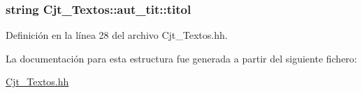 \subsubsection[{\texorpdfstring{titol}{titol}}]{\setlength{\rightskip}{0pt plus 5cm}string Cjt\+\_\+\+Textos\+::aut\+\_\+tit\+::titol}\hypertarget{struct_cjt___textos_1_1aut__tit_a4d7d3796333130213bcbe0ba9cd4ec83}{}\label{struct_cjt___textos_1_1aut__tit_a4d7d3796333130213bcbe0ba9cd4ec83}


Definición en la línea 28 del archivo Cjt\+\_\+\+Textos.\+hh.



La documentación para esta estructura fue generada a partir del siguiente fichero\+:\begin{DoxyCompactItemize}
\item 
\hyperlink{_cjt___textos_8hh}{Cjt\+\_\+\+Textos.\+hh}\end{DoxyCompactItemize}
